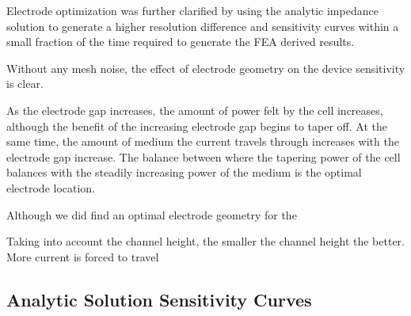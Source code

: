 \par Electrode optimization was further clarified by using the analytic impedance solution to generate a higher resolution difference and sensitivity curves within a small fraction of the time required to generate the FEA derived results. 

\par Without any mesh noise, the effect of electrode geometry on the device sensitivity is clear. 

\par As the electrode gap increases, the amount of power felt by the cell increases, although the benefit of the increasing electrode gap begins to taper off. At the same time, the amount of medium the current travels through increases with the electrode gap increase. The balance between where the tapering power of the cell balances with the steadily increasing power of the medium is the optimal electrode location.

\par Although we did find an optimal electrode geometry for the 

\par Taking into account the channel height, the smaller the channel height the better. More current is forced to travel 

\subsection{Analytic Solution Sensitivity Curves}

